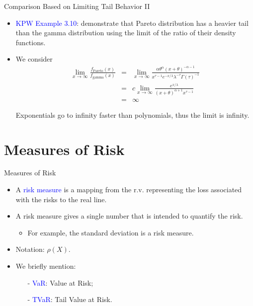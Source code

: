 \documentclass{beamer}
\begin{document}
\begin{frame}{Comparison Based on Limiting Tail Behavior II}
\begin{itemize}
\item \textcolor{blue}{KPW Example 3.10}: demonstrate that Pareto distribution has a heavier tail than the gamma distribution using the limit of the ratio of their density functions.
\vspace{0.3cm}
\item We consider
\begin{eqnarray*}
\lim_{x\to \infty} \frac{f_{\text{Pareto}}(x)}{f_{\text{gamma}}(x)} &=& \lim_{x \to \infty} \frac{\alpha \theta^{\alpha} (x+ \theta)^{-\alpha-1}}{x^{\tau-1} e^{-x/\lambda} \lambda^{-\tau} \Gamma(\tau)^{-1}} \\
&=& c \lim_{x\to \infty} \frac{e^{x/\lambda}}{(x+\theta)^{\alpha+1} x^{\tau-1}} \\
&=& \infty
\end{eqnarray*}
\item[] Exponentials go to infinity faster than polynomials, thus the limit is infinity.
\end{itemize}
\end{frame}

\section{Measures of Risk}

\begin{frame}{Measures of Risk}
\begin{itemize}
\item A \textcolor{blue}{risk measure} is a mapping from the r.v. representing the loss associated with the risks to the real line.
\vspace{0.3cm}
\item A risk measure gives a single number that is intended to quantify the risk.
\vspace{0.3cm}
\begin{itemize}\item For example, the standard deviation is a risk measure.\end{itemize}
\vspace{0.3cm}
\item Notation: $\rho(X)$.
\vspace{0.4cm}
\item We briefly mention:
\vspace{0.3cm}
\begin{itemize}
\item[-] \textcolor{blue}{VaR}: Value at Risk;
\item[-] \textcolor{blue}{TVaR}: Tail Value at Risk.
\end{itemize}
\end{itemize}
\end{frame}
\end{document}
